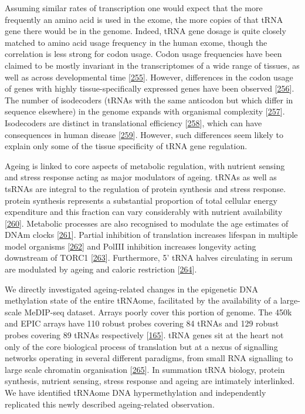 \documentclass[
]{book}
\begin{document}
Assuming similar rates of transcription one would expect that the more frequently an amino acid is used in the exome, the more copies of that tRNA gene there would be in the genome.
Indeed, tRNA gene dosage is quite closely matched to amino acid usage frequency in the human exome, though the correlation is less strong for codon usage.
Codon usage frequencies have been claimed to be mostly invariant in the transcriptomes of a wide range of tissues, as well as across developmental time {[}\protect\hyperlink{ref-Schmitt2014}{255}{]}.
However, differences in the codon usage of genes with highly tissue-specifically expressed genes have been observed {[}\protect\hyperlink{ref-Powell1997}{256}{]}.
The number of isodecoders (tRNAs with the same anticodon but which differ in sequence elsewhere) in the genome expands with organismal complexity {[}\protect\hyperlink{ref-Goodenbour2006}{257}{]}.
Isodecoders are distinct in translational efficiency {[}\protect\hyperlink{ref-Geslain2010}{258}{]}, which can have consequences in human disease {[}\protect\hyperlink{ref-Kirchner2017}{259}{]}.
However, such differences seem likely to explain only some of the tissue specificity of tRNA gene regulation.

Ageing is linked to core aspects of metabolic regulation, with nutrient sensing and stress response acting as major modulators of ageing.
tRNAs as well as tsRNAs are integral to the regulation of protein synthesis and stress response.
protein synthesis represents a substantial proportion of total cellular energy expenditure and this fraction can vary considerably with nutrient availability {[}\protect\hyperlink{ref-Pace2006}{260}{]}.
Metabolic processes are also recognised to modulate the age estimates of DNAm clocks {[}\protect\hyperlink{ref-Nwanaji-Enwerem2018}{261}{]}.
Partial inhibition of translation increases lifespan in multiple model organisms {[}\protect\hyperlink{ref-Hansen2007}{262}{]} and PolIII inhibition increases longevity acting downstream of TORC1 {[}\protect\hyperlink{ref-Filer2017}{263}{]}.
Furthermore, 5' tRNA halves circulating in serum are modulated by ageing and caloric restriction {[}\protect\hyperlink{ref-Dhahbi2013}{264}{]}.

We directly investigated ageing-related changes in the epigenetic DNA methylation state of the entire tRNAome, facilitated by the availability of a large-scale MeDIP-seq dataset.
Arrays poorly cover this portion of genome.
The 450k and EPIC arrays have 110 robust probes covering 84 tRNAs and 129 robust probes covering 89 tRNAs respectively {[}\protect\hyperlink{ref-Zhou2017}{165}{]}.
tRNA genes sit at the heart not only of the core biological process of translation but at a nexus of signalling networks operating in several different paradigms, from small RNA signalling to large scale chromatin organisation {[}\protect\hyperlink{ref-VanBortle2017}{265}{]}.
In summation tRNA biology, protein synthesis, nutrient sensing, stress response and ageing are intimately interlinked.
We have identified tRNAome DNA hypermethylation and independently replicated this newly described ageing-related observation.
\end{document}
